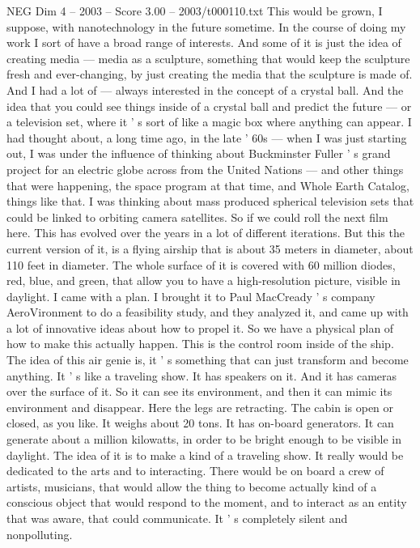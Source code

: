 \begin{textsample}{NEG Dim 4 – 2003 – Score 3.00 – 2003/t000110.txt}
This would be grown, I suppose, with nanotechnology in the future sometime.
In the course of doing my work I sort of have a broad range of interests.
And some of it is just the idea of creating media — media as a sculpture, something that would keep the sculpture fresh and ever-changing, by just creating the media that the sculpture is made of.
And I had a lot of — always interested in the concept of a crystal ball.
And the idea that you could see things inside of a crystal ball and predict the future — or a television set, where it ' s sort of like a magic box where anything can appear.
I had thought about, a long time ago, in the late ' 60s — when I was just starting out, I was under the influence of thinking about Buckminster Fuller ' s grand project for an electric globe across from the United Nations — and other things that were happening, the space program at that time, and Whole Earth Catalog, things like that.
I was thinking about mass produced spherical television sets that could be linked to orbiting camera satellites.
So if we could roll the next film here.
This has evolved over the years in a lot of different iterations.
But this the current version of it, is a flying airship that is about 35 meters in diameter, about 110 feet in diameter.
The whole surface of it is covered with 60 million diodes, red, blue, and green, that allow you to have a high-resolution picture, visible in daylight.
I came with a plan.
I brought it to Paul MacCready ' s company AeroVironment to do a feasibility study, and they analyzed it, and came up with a lot of innovative ideas about how to propel it.
So we have a physical plan of how to make this actually happen.
This is the control room inside of the ship.
The idea of this air genie is, it ' s something that can just transform and become anything.
It ' s like a traveling show.
It has speakers on it.
And it has cameras over the surface of it.
So it can see its environment, and then it can mimic its environment and disappear.
Here the legs are retracting.
The cabin is open or closed, as you like.
It weighs about 20 tons.
It has on-board generators.
It can generate about a million kilowatts, in order to be bright enough to be visible in daylight.
The idea of it is to make a kind of a traveling show.
It really would be dedicated to the arts and to interacting.
There would be on board a crew of artists, musicians, that would allow the thing to become actually kind of a conscious object that would respond to the moment, and to interact as an entity that was aware, that could communicate.
It ' s completely silent and nonpolluting.

\end{textsample}
